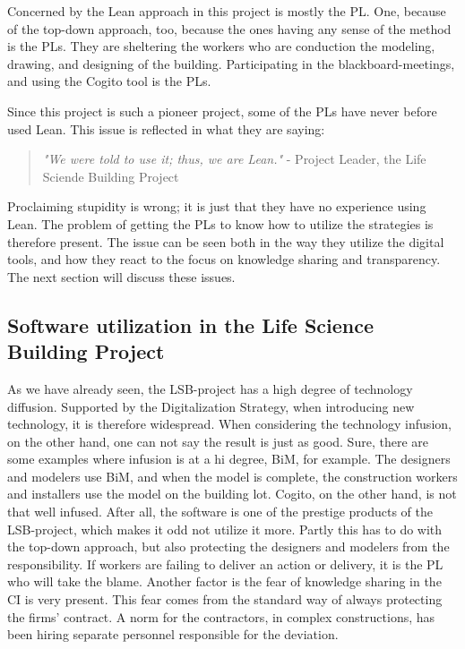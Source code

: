 Concerned by the Lean approach in this project is mostly the PL. One, because of the top-down approach, too, because the ones having any sense of the method is the PLs. They are sheltering the workers who are conduction the modeling, drawing, and designing of the building. Participating in the blackboard-meetings, and using the Cogito tool is the PLs. 

Since this project is such a pioneer project, some of the PLs have never before used Lean. This issue is reflected in what they are saying:  
\begin{quote}
    \textit{"We were told to use it; thus, we are Lean."} - Project Leader, the Life Sciende Building Project
\end{quote}
Proclaiming stupidity is wrong; it is just that they have no experience using Lean. The problem of getting the PLs to know how to utilize the strategies is therefore present. The issue can be seen both in the way they utilize the digital tools, and how they react to the focus on knowledge sharing and transparency. The next section will discuss these issues.

\subsection{Software utilization in the Life Science Building Project}
As we have already seen, the LSB-project has a high degree of technology diffusion. Supported by the Digitalization Strategy, when introducing new technology, it is therefore widespread. When considering the technology infusion, on the other hand, one can not say the result is just as good. Sure, there are some examples where infusion is at a hi degree, BiM, for example. The designers and modelers use BiM, and when the model is complete, the construction workers and installers use the model on the building lot. Cogito, on the other hand, is not that well infused. After all, the software is one of the prestige products of the LSB-project, which makes it odd not utilize it more. Partly this has to do with the top-down approach, but also protecting the designers and modelers from the responsibility. If workers are failing to deliver an action or delivery, it is the PL who will take the blame. Another factor is the fear of knowledge sharing in the CI is very present. This fear comes from the standard way of always protecting the firms' contract. A norm for the contractors, in complex constructions, has been hiring separate personnel responsible for the deviation. 

